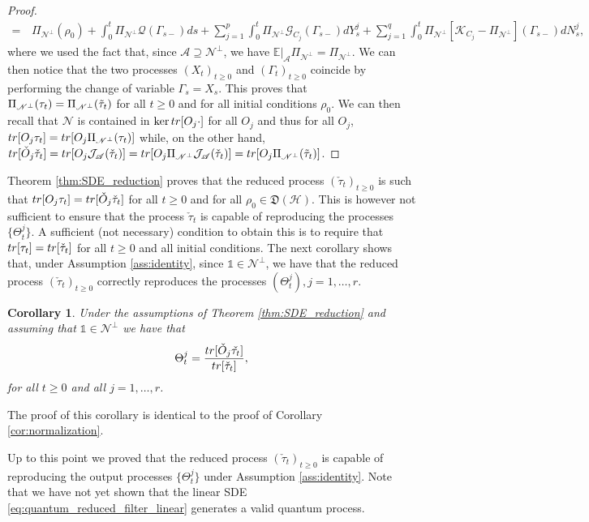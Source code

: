 \documentclass[aihp,12pt]{imsart}
\newcommand{\Gc}{\mathcal{G}}
\newcommand{\Hc}{\mathcal{H}}
\newcommand{\Jc}{\mathcal{J}}
\newcommand{\Qc}{\mathcal{Q}}
\newcommand{\Kc}{\mathcal{K}}
\newcommand{\As}{\mathscr{A}}
\newcommand{\Ns}{\mathscr{N}}
\newcommand{\Df}{\mathfrak{D}}
\newcommand{\CE}{\mathbb{E}|}
\newcommand{\one}{\mathbb{1}}
\newcommand{\tr}{{\rm tr}}
\theoremstyle{theorem}
\newtheorem{corollary}{Corollary}
\theoremstyle{definition}
\theoremstyle{remark}
\begin{document}
\begin{proof}
\begin{align*}
        =\,& \Pi_{\Ns^\perp}(\rho_0) + \int_{0}^t \Pi_{\Ns^\perp}{\Qc} (\Gamma_{s-}) ds + \sum_{j=1}^p \int_{0}^t \Pi_{\Ns^\perp}{\Gc}_{C_j} (\Gamma_{s-}) dY_s^j 
        +\sum_{j=1}^q \int_{0}^t \Pi_{\Ns^\perp}[\Kc_{C_j}-\Pi_{\Ns^\perp}](\Gamma_{s-}) dN_s^j,
    \end{align*}
    where we used the fact that, since $\As\supseteq\Ns^\perp$, we have $\CE_\As\Pi_{\Ns^\perp} = \Pi_{\Ns^\perp}$. We can then notice that the two processes $(X_t)_{t\geq0}$ and $(\Gamma_t)_{t\geq0}$ coincide by performing the change of variable $\Gamma_s = X_s$. This proves that $\Pi_{\Ns^\perp}(\tau_t) = \Pi_{\Ns^\perp}(\Tilde{\tau}_t)$ for all $t\geq0$ and for all initial conditions $\rho_0$. We can then recall that $\Ns$ is contained in $\ker \tr[O_j \cdot]$ for all $O_j$ and thus for all $O_j$, $\tr[O_j \tau_t] = \tr[O_j \Pi_{\Ns^\perp}(\tau_t)]$ while, on the other hand, $\tr[\check{O}_j\check{\tau}_t] = \tr[O_j \Jc_{\As}(\check{\tau}_t)] = \tr[O_j \Pi_{\Ns^\perp}  \Jc_{\As}(\check{\tau}_t)] = \tr[O_j \Pi_{\Ns^\perp}(\Tilde{\tau}_t)]$.
\end{proof}

Theorem \ref{thm:SDE_reduction} proves that the reduced process $(\check{\tau}_t)_{t\geq0}$ is such that $\tr[O_j\tau_t] = \tr[\check{O}_j\check{\tau}_t]$ for all $t\geq0$ and for all $\rho_0\in\Df(\Hc)$. This is however not sufficient to ensure that the process $\check{\tau}_t$ is capable of reproducing the processes $\{\Theta_t^j\}$. A sufficient (not necessary) condition to obtain this is to require that $\tr[\tau_t]=\tr[\check{\tau}_t]$ for all $t\geq0$ and all initial conditions. The next corollary shows that, under Assumption \ref{ass:identity}, since $\one\in\Ns^\perp$, we have that the reduced process $(\check{\tau}_t)_{t\geq0}$ correctly reproduces the processes $(\Theta_t^j),j=1,\ldots,r$. 
\begin{corollary}
\label{cor:normalization_quantum}
    Under the assumptions of Theorem \ref{thm:SDE_reduction} and assuming that $\one\in\Ns^\perp$ we have that $$\Theta_t^j = \frac{\tr[\check{O}_j\check{\tau_t}]}{\tr[\check{\tau}_t]},$$ for all $t\geq0$ and all $j=1,\ldots,r$.
\end{corollary}
The proof of this corollary is identical to the proof of Corollary \ref{cor:normalization}.

Up to this point we proved that the reduced process $(\check{\tau}_t)_{t\geq0}$ is capable of reproducing the output processes $\{\Theta_t^j\}$ under Assumption \ref{ass:identity}. Note that we have not yet shown that the linear SDE \eqref{eq:quantum_reduced_filter_linear} generates a valid quantum process. 
\end{document}

